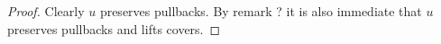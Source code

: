 \begin{proof}
Clearly $u$ preserves pullbacks.
By remark ? it is also immediate that $u$ preserves pullbacks and lifts covers.
\end{proof}



